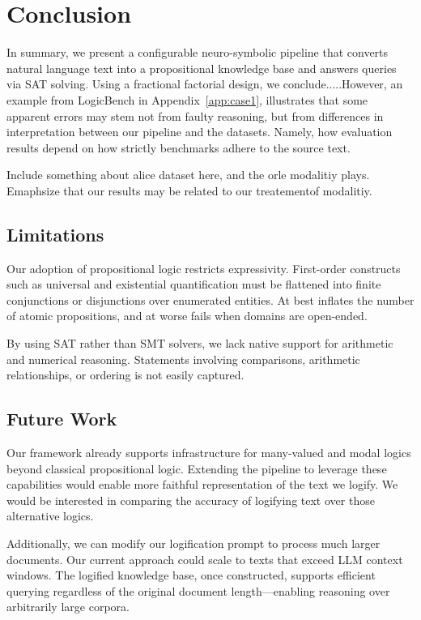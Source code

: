 \documentclass{article} %
\begin{document}
\section{Conclusion}

In summary, we present a configurable neuro-symbolic pipeline that converts natural language text into a propositional knowledge base and answers queries via SAT solving. Using a fractional factorial design, we conclude.....However, an example from LogicBench in Appendix~\ref{app:case1}, illustrates that some apparent errors may stem not from faulty reasoning, but from differences in interpretation between our pipeline and the datasets. Namely, how evaluation results depend on how strictly benchmarks adhere to the source text.

Include something about alice dataset here, and the orle modalitiy plays. Emaphsize that our results may be related to our treatementof modalitiy.  


\subsection{Limitations}
Our adoption of propositional logic restricts expressivity. First-order constructs such as universal and existential quantification must be flattened into finite conjunctions or disjunctions over enumerated entities. At best inflates the number of atomic propositions, and at worse fails when domains are open-ended. 

By using SAT rather than SMT solvers, we lack native support for arithmetic and numerical reasoning. Statements involving comparisons, arithmetic relationships, or ordering is not easily captured. 




\subsection{Future Work}
Our framework already supports infrastructure for many-valued and modal logics beyond classical propositional logic. Extending the pipeline to leverage these capabilities would enable more faithful representation of the text we logify. We would be interested in comparing the accuracy of logifying text over those alternative logics. 

Additionally, we can modify our logification prompt to process much larger documents. Our current approach could scale to texts that exceed LLM context windows. The logified knowledge base, once constructed, supports efficient querying regardless of the original document length---enabling reasoning over arbitrarily large corpora.
\end{document}
